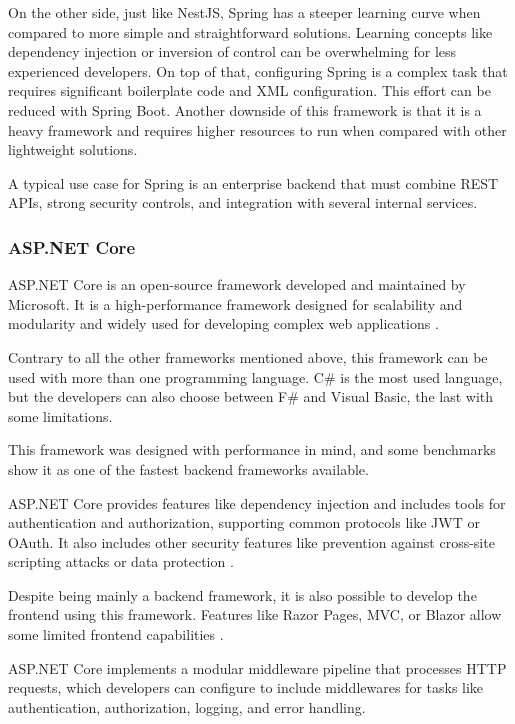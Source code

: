 On the other side, just like NestJS, Spring has a steeper learning curve when
compared to more simple and straightforward solutions. Learning concepts like
dependency injection or inversion of control can be overwhelming for less
experienced developers.
On top of that, configuring Spring is a complex task that requires significant
boilerplate code and \gls{XML} configuration. This effort can be reduced with Spring
Boot.
Another downside of this framework is that it is a heavy framework and
requires higher resources to run when compared with other lightweight solutions.

A typical use case for Spring is an enterprise backend that must combine
\gls{REST} \gls{API}s, strong security controls, and integration with several
internal services.

\subsubsection{ASP.NET Core}
ASP.NET Core is an open-source framework developed and maintained by Microsoft.
It is a high-performance framework designed for scalability and modularity and
widely used for developing complex web applications \cite{ASPMicrosoft}.

Contrary to all the other frameworks mentioned above, this framework can be
used with more than one programming language. C\# is the most used language, but
the developers can also choose between F\# and Visual Basic, the last with some
limitations.

This framework was designed with performance in mind, and some benchmarks show
it as one of the fastest backend frameworks available.

ASP.NET Core provides features like dependency injection and includes tools for
authentication and authorization, supporting common protocols like \gls{JWT} or OAuth.
It also includes other security features like prevention against cross-site
scripting attacks or data protection \cite{ASPMicrosoft}.

Despite being mainly a backend framework, it is also possible to develop the
frontend using this framework. Features like Razor Pages, \gls{MVC}, or Blazor allow
some limited frontend capabilities \cite{ASPMicrosoft}.

ASP.NET Core implements a modular middleware pipeline that processes \gls{HTTP}
requests, which developers can configure to include middlewares for tasks like
authentication, authorization, logging, and error handling.

